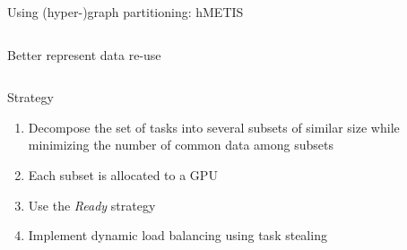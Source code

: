 \documentclass{libs/ufc_format}
\begin{document}
\begin{frame}{Using (hyper-)graph partitioning: hMETIS}
\begin{columns}{}
\begin{column}{0.6\textwidth}
Better represent data re-use
\end{column}
\end{columns}
	\begin{block}{Strategy}
	\begin{enumerate}
		\item Decompose the set of tasks into several subsets of similar size while minimizing the number of common data among subsets
		\item Each subset is allocated to a GPU
		\item Use the \emph{Ready} strategy
		\item Implement dynamic load balancing using task stealing
	\end{enumerate}
	\end{block}
\end{frame}

\end{document}
